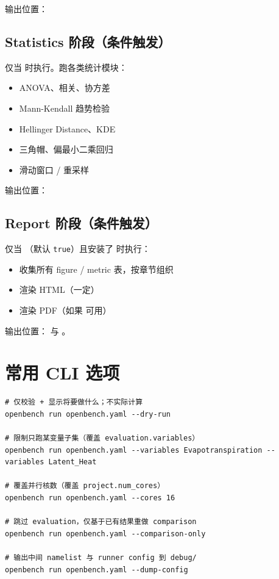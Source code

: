 输出位置：

\subsection{Statistics 阶段（条件触发）}

仅当  时执行。跑各类统计模块：

\begin{itemize}
  \item ANOVA、相关、协方差
  \item Mann-Kendall 趋势检验
  \item Hellinger Distance、KDE
  \item 三角帽、偏最小二乘回归
  \item 滑动窗口 / 重采样
\end{itemize}

输出位置：

\subsection{Report 阶段（条件触发）}

仅当 （默认 \texttt{true}）且安装了  时执行：

\begin{itemize}
  \item 收集所有 figure / metric 表，按章节组织
  \item 渲染 HTML（一定）
  \item 渲染 PDF（如果  可用）
\end{itemize}

输出位置： 与 。


\section{常用 CLI 选项}

\begin{verbatim}
# 仅校验 + 显示将要做什么；不实际计算
openbench run openbench.yaml --dry-run

# 限制只跑某变量子集（覆盖 evaluation.variables）
openbench run openbench.yaml --variables Evapotranspiration --variables Latent_Heat

# 覆盖并行核数（覆盖 project.num_cores）
openbench run openbench.yaml --cores 16

# 跳过 evaluation，仅基于已有结果重做 comparison
openbench run openbench.yaml --comparison-only

# 输出中间 namelist 与 runner config 到 debug/
openbench run openbench.yaml --dump-config
\end{verbatim}

